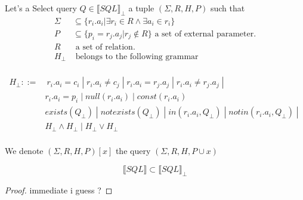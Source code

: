 \begin{mydef}
Let's a Select query $Q \in \llbracket SQL\rrbracket _\bot$ a tuple $(\Sigma,R,H,P)$ such that
\begin{align*}
\Sigma & \subseteq \{r_i.a_i | \exists r_i \in R \land \exists a_i \in r_i \} \\
P & \subseteq \{p_i = r_j.a_j | r_j \notin R\} \mbox{ a set of external parameter.}\\
R & \mbox{ a set of relation.}\\
H_\bot &  \mbox{ belongs to the following grammar}\\
\end{align*}

\begin{align*}
H_{\bot} ::= &\ r_i.a_i = c_i \; |\; r_i.a_i \neq c_j \; |\; r_i.a_i = r_j.a_j \; |\;  r_i.a_i \neq r_j.a_j \; |
\\&  r_i.a_i = p_i\; |\; null(r_i.a_i) \; |\;  const(r_i.a_i)\;
\\ &  exists(Q_{\bot}) \; |\; notexists(Q_{\bot}) \; |\; in(r_i.a_i,Q_{\bot}) \; |\; notin(r_i.a_i,Q_{\bot}) \; |\; 
\\ & H_{\bot}\land H_{\bot} \; |\; H_{\bot} \lor H_{\bot} 
\\
\end{align*}

\end{mydef}

We denote $(\Sigma,R,H,P)[x]$ the query $(\Sigma,R,H,P\cup x)$

\begin{myprop}
	$$\llbracket SQL\rrbracket \subset \llbracket SQL\rrbracket _\bot$$
\end{myprop}
\begin{proof}
	immediate i guess ?
\end{proof}

